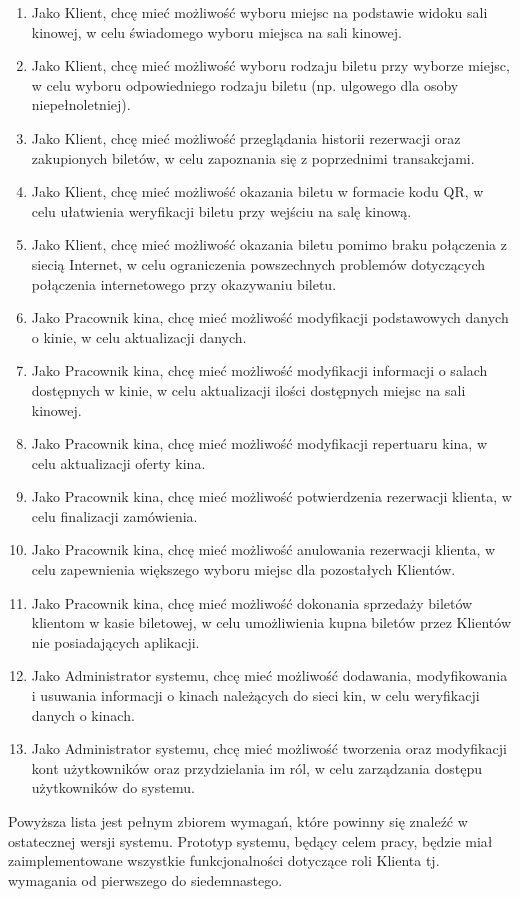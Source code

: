 \begin{enumerate}
\item Jako Klient, chcę mieć możliwość wyboru miejsc na podstawie widoku sali kinowej, w celu świadomego wyboru miejsca na sali kinowej.
\item Jako Klient, chcę mieć możliwość wyboru rodzaju biletu przy wyborze miejsc, w celu wyboru odpowiedniego rodzaju biletu (np. ulgowego dla osoby niepełnoletniej).
\item Jako Klient, chcę mieć możliwość przeglądania historii rezerwacji oraz zakupionych biletów, w celu   zapoznania się z poprzednimi transakcjami.
\item Jako Klient, chcę mieć możliwość okazania biletu w formacie kodu QR, w celu ułatwienia weryfikacji biletu przy wejściu na salę kinową.
\item Jako Klient, chcę mieć możliwość okazania biletu pomimo braku połączenia z siecią Internet, w celu ograniczenia powszechnych problemów dotyczących połączenia internetowego przy okazywaniu biletu.\newline
\item Jako Pracownik kina, chcę mieć możliwość modyfikacji podstawowych danych o kinie, w celu aktualizacji danych.
\item Jako Pracownik kina, chcę mieć możliwość modyfikacji informacji o salach dostępnych w kinie, w celu aktualizacji ilości dostępnych miejsc na sali kinowej.
\item Jako Pracownik kina, chcę mieć możliwość modyfikacji repertuaru kina, w celu aktualizacji oferty kina.
\item Jako Pracownik kina, chcę mieć możliwość potwierdzenia rezerwacji klienta, w celu finalizacji zamówienia.
\item Jako Pracownik kina, chcę mieć możliwość anulowania rezerwacji klienta, w celu zapewnienia większego wyboru miejsc dla pozostałych Klientów.
\item Jako Pracownik kina, chcę mieć możliwość dokonania sprzedaży biletów klientom w kasie biletowej, w celu umożliwienia kupna biletów przez Klientów nie posiadających aplikacji.
\item Jako Administrator systemu, chcę mieć możliwość dodawania, modyfikowania i usuwania informacji o kinach należących do sieci kin, w celu weryfikacji danych o kinach.
\item Jako Administrator systemu, chcę mieć możliwość tworzenia oraz modyfikacji kont użytkowników oraz przydzielania im ról, w celu zarządzania dostępu użytkowników do systemu.
\end{enumerate}
Powyższa lista jest pełnym zbiorem wymagań, które powinny się znaleźć w ostatecznej wersji systemu. Prototyp systemu, będący celem pracy, będzie miał zaimplementowane wszystkie funkcjonalności dotyczące roli Klienta tj. wymagania od pierwszego do siedemnastego.
\newpage
